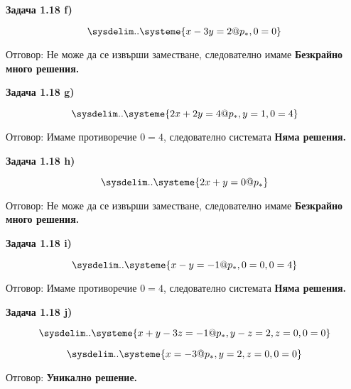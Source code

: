 \documentclass{subfiles}
\begin{document}
\noindent \textbf{Задача 1.18 f)}

\begin{equation*}
    \sysdelim..\systeme{
        x - 3y = 2@p_{*},
        0 = 0
    }
\end{equation*}

\noindent Отговор: Не може да се извърши заместване, следователно имаме \textbf{Безкрайно много решения.}

\noindent \textbf{Задача 1.18 g)}

\begin{equation*}
    \sysdelim..\systeme{
        2x + 2y = 4@p_{*},
        y = 1,
        0 = 4
    }
\end{equation*}

\noindent Отговор: Имаме противоречие $0=4$, следователно системата \textbf{Няма решения.}

\noindent \textbf{Задача 1.18 h)}

\begin{equation*}
    \sysdelim..\systeme{
        2x + y = 0@p_{*}
    }
\end{equation*}

\noindent Отговор: Не може да се извърши заместване, следователно имаме \textbf{Безкрайно много решения.}


\noindent \textbf{Задача 1.18 i)}

\begin{equation*}
    \sysdelim..\systeme{
        x - y = -1@p_{*},
        0 = 0,
        0 = 4
    }
\end{equation*}

\noindent Отговор: Имаме противоречие $0=4$, следователно системата \textbf{Няма решения.}

\noindent \textbf{Задача 1.18 j)}

\begin{equation*}
    \sysdelim..\systeme{
        x + y - 3z = -1@p_{*},
        y - z = 2,
        z = 0,
        0 = 0
    }
\end{equation*}

\begin{equation*}
    \sysdelim..\systeme{
        x = -3@p_{*},
        y = 2,
        z = 0,
        0 = 0
    }
\end{equation*}

\noindent Отговор: \textbf{Уникално решение.}
\end{document}

